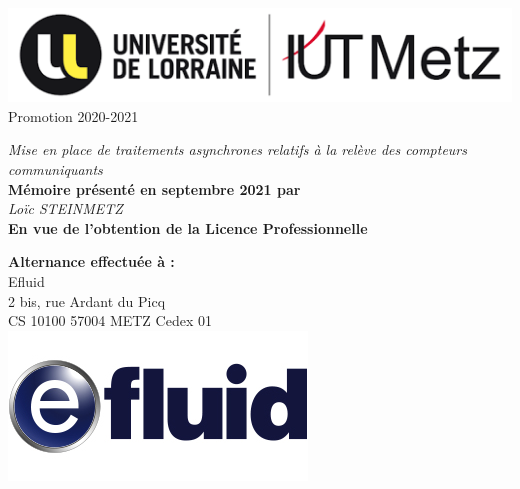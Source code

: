 \documentclass[a4paper, 12pt]{report}
\begin{document}
\renewcommand \partname{\thispagestyle{empty}}
\doparttoc

\thispagestyle{empty}
\begin{singlespace}
\begin{center}  
\begin{multicols}{2}
  \flushleft
  \null
  \includegraphics[width=\columnwidth]{../res/logo-iut.png}
  \flushright
  \null
  \vspace{0.3cm}
  \large{Promotion 2020-2021}
\end{multicols}
\vspace{2cm}
\LARGE{\textit{Mise en place de traitements asynchrones relatifs à la relève des compteurs communiquants}}\\
\vspace{2cm}
\large{\textbf{Mémoire présenté en septembre 2021 par}}\\
\vspace{0.5cm}
\Large{\textit{Loïc STEINMETZ}}\\
\vspace{2cm}
\large{\textbf{En vue de l'obtention de la Licence Professionnelle}}\\
\vspace{0.5cm}
\vspace{2.8cm}
\begin{multicols}{2}
  \flushleft
  \null
  \textbf{Alternance effectuée à :}\\
  Efluid\\
  2 bis, rue Ardant du Picq\\
  CS 10100 57004 METZ Cedex 01\\
  \flushright
  \null
  \includegraphics[width=.6\columnwidth]{../res/logo-efluid.jpg}
\end{multicols}
\end{center}
\end{singlespace}
\end{document}
